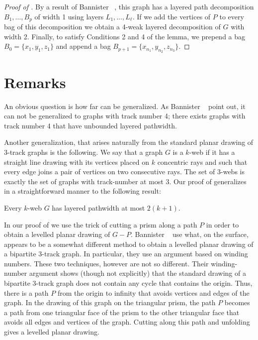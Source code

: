 \documentclass{patmorin}
\begin{document}
\begin{proof}[Proof of ]
  By a result of Bannister \etal\ \cite[Proof of
  Theorem~5]{bannister.devanny.ea:track}, this graph has a
  layered path decomposition $B_1,\ldots,B_p$ of width 1 using layers
  $L_1,\ldots,L_\ell$.  If we add the vertices of $P$ to every bag
  of this decomposition we obtain a 4-weak layered decomposition of
  $G$ with width 2.  Finally, to satisfy Conditions 2 and 4 of the
  lemma, we prepend a bag $B_0=\{x_1,y_1,z_1\}$ and append a bag
  $B_{p+1}=\{x_{n_1},y_{n_2},z_{n_3}\}$.
\end{proof}

\section{Remarks}

An obvious question is how far  can be generalized. As
Bannister \etal\ \cite{bannister.devanny.ea:track} point out, it can not be generalized to graphs with
track number 4; there exists graphs with track number 4 that have 
unbounded layered pathwidth.

Another generalization, that arises naturally from the standard planar
drawing of 3-track graphs is the following. We say that a graph $G$
is a $k$-web if it has a straight line drawing with its vertices placed
on $k$ concentric rays and such that every edge joins a pair of vertices
on two consecutive rays.  The set of 3-webs is exactly the set of graphs
with track-number at most 3.  Our proof of  generalizes in a straightforward manner to the following result:

\begin{thm}
   Every $k$-web $G$ has layered pathwidth at most $2(k+1)$.
\end{thm}

In our proof of  we use the trick of cutting a prism along
a path $P$ in order to obtain a levelled planar drawing of $G-P$.
Bannister \etal\ \cite{bannister.devanny.ea:track} use what, on the
surface, appears to be a somewhat different method to obtain a levelled
planar drawing of a bipartite 3-track graph.  In particular, they use
an argument based on winding numbers.  These two techniques, however
are not so different. Their winding-number argument shows (though not
explicitly) that the standard drawing of a bipartite 3-track graph
does not contain any cycle that contains the origin.  Thus, there is
a path $P$ from the origin to infinity that avoids vertices and edges
of the graph.  In the drawing of this graph on the triangular prism,
the path $P$ becomes a path from one triangular face of the prism to the
other triangular face that avoids all edges and vertices of the graph.
Cutting along this path and unfolding gives a levelled planar drawing.




\end{document}
